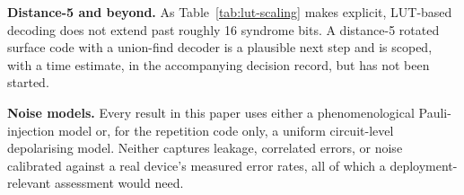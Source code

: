 \textbf{Distance-5 and beyond.} As Table~\ref{tab:lut-scaling} makes explicit, LUT-based decoding does not extend past roughly 16 syndrome bits. A distance-5 rotated surface code with a union-find decoder is a plausible next step and is scoped, with a time estimate, in the accompanying decision record, but has not been started.

\textbf{Noise models.} Every result in this paper uses either a phenomenological Pauli-injection model or, for the repetition code only, a uniform circuit-level depolarising model. Neither captures leakage, correlated errors, or noise calibrated against a real device's measured error rates, all of which a deployment-relevant assessment would need.

